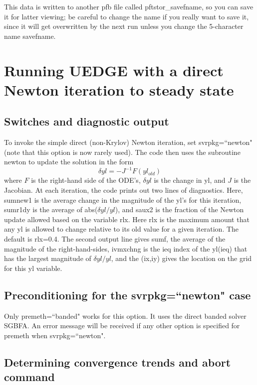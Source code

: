 \documentclass [12pt]{article}
\begin{document}
This data is written to another pfb file called {\sf pftstor\_savefname}, so
you can save it for latter viewing; be careful to change the name if you
really want to save it, since it will get overwritten by the next run unless
you change the 5-character name savefname.


\section{Running {\sf UEDGE} with a direct Newton iteration to steady state}

\subsection{Switches and diagnostic output}

To invoke the simple direct (non-Krylov) Newton iteration, set {\sf
svrpkg=``newton"} (note that this option is now rarely used). The code then
uses the subroutine {\sf newton} to update the solution in the form
\begin{equation}
  \label{delyleq}
  \delta yl = -J^{-1} F(yl_{old})
\end{equation}
where $F$ is the right-hand side of the ODE's, $\delta yl$ is the change in
{\sf yl}, and $J$ is the Jacobian.  At each iteration, the code prints out two
lines of diagnostics.  Here, sumnew1 is the average change in the magnitude of
the {\sf yl}'s for this iteration, sumr1dy is the average of abs($\delta
yl/yl$), and saux2 is the fraction of the Newton update allowed based on the
variable rlx.  Here rlx is the maximum amount that any {\sf yl} is allowed to
change relative to its old value for a given iteration.  The default is
rlx=0.4.  The second output line gives sumf, the average of the magnitude of
the right-hand-sides, ivmxchng is the ieq index of the {\sf yl(ieq)} that has
the largest magnitude of $\delta yl/yl$, and the {\sf (ix,iy)} gives the
location on the grid for this {\sf yl} variable.
 
\subsection{Preconditioning for the {\sf svrpkg=``newton"} case}

Only {\sf premeth=``banded"} works for this option. It uses the direct banded
solver SGBFA.  An error message will be received if any other option is
specified for premeth when {\sf svrpkg=``newton"}.

\subsection{Determining convergence trends and abort command}
 
\end{document}
